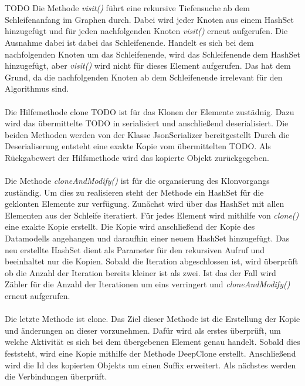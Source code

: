     \\
    \\
    TODO
    Die Methode \textit{visit()} führt eine rekursive Tiefensuche ab dem Schleifenanfang im Graphen durch.
    Dabei wird jeder Knoten aus einem HashSet hinzugefügt und für jeden nachfolgenden Knoten \textit{visit()} erneut aufgerufen.
    Die Ausnahme dabei ist dabei das Schleifenende.
    Handelt es sich bei dem nachfolgenden Knoten um das Schleifenende, wird das Schleifenende dem HashSet hinzugefügt, aber \textit{visit()} wird nicht für dieses Element aufgerufen.
    Das hat dem Grund, da die nachfolgenden Knoten ab dem Schleifenende irrelevant für den Algorithmus sind.\\
    \\
    Die Hilfemethode clone TODO ist für das Klonen der Elemente zustädnig. Dazu wird das übermittelte TODO in serialisiert und anschließend deserialisiert.
    Die beiden Methoden werden von der Klasse JsonSerializer bereitgestellt
    Durch die Deserialiserung entsteht eine exakte Kopie vom übermittelten TODO.
    Als Rückgabewert der Hilfsmethode wird das kopierte Objekt zurückgegeben.\\
    \\
    Die Methode \textit{cloneAndModify()} ist für die organsierung des Klonvorgangs zuständig.
    Um dies zu realisieren steht der Methode ein HashSet für die geklonten Elemente zur verfügung.
    Zunächst wird über das HashSet mit allen Elementen aus der Schleife iteratiert.
    Für jedes Element wird mithilfe von \textit{clone()} eine exakte Kopie erstellt.
    Die Kopie wird anschließend der Kopie des Datamodells angehangen und daraufhin einer neuem HashSet hinzugefügt.
    Das neu erstellte HashSet dient als Parameter für den rekursiven Aufruf und beeinhaltet nur die Kopien.
    Sobald die Iteration abgeschlossen ist, wird überprüft ob die Anzahl der Iteration bereits kleiner ist als zwei.
    Ist das der Fall wird Zähler für die Anzahl der Iterationen um eins verringert und \textit{cloneAndModify()} erneut aufgerufen.\\
    \\
    Die letzte Methode ist clone.
    Das Ziel dieser Methode ist die Erstellung der Kopie und änderungen an dieser vorzunehmen.
    Dafür wird als erstes überprüft, um welche Aktivität es sich bei dem übergebenen Element genau handelt.
    Sobald dies feststeht, wird eine Kopie mithilfe der Methode DeepClone erstellt.
    Anschließend wird die Id des kopierten Objekts um einen Suffix erweitert.
    Als nächstes werden die Verbindungen überprüft. 
